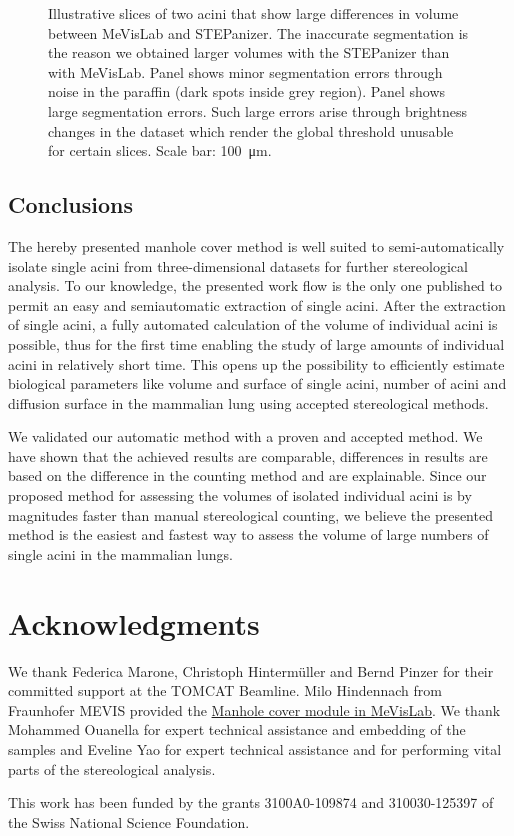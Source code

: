 \documentclass[twoside,paper=a4,abstract=true,english,DIV=calc]{scrartcl}
\begin{document}
\begin{figure}
{		\label{subfig:60e_acinus38}%
	}%
	\hfill%
	\caption{Illustrative slices of two acini that show large differences in volume between MeVisLab and STEPanizer. The inaccurate segmentation is the reason we obtained larger volumes with the STEPanizer than with MeVisLab. Panel \protect{} shows minor segmentation errors through noise in the paraffin (dark spots inside grey region). Panel \protect{} shows large segmentation errors. Such large errors arise through brightness changes in the dataset which render the global threshold unusable for certain slices. Scale bar: \SI{100}{\micro\meter}.}
	\label{fig:MeVisSegmentation}
\end{figure}

\subsection{Conclusions}
The hereby presented manhole cover method is well suited to semi-automatically isolate single acini from three-dimensional datasets for further stereological analysis. To our knowledge, the presented work flow is the only one published to permit an easy and semiautomatic extraction of single acini. After the extraction of single acini, a fully automated calculation of the volume of individual acini is possible, thus for the first time enabling the study of large amounts of individual acini in relatively short time. This opens up the possibility to efficiently estimate biological parameters like volume and surface of single acini, number of acini and diffusion surface in the mammalian lung using accepted stereological methods.

We validated our automatic method with a proven and accepted method. We have shown that the achieved results are comparable, differences in results are based on the difference in the counting method and are explainable. Since our proposed method for assessing the volumes of isolated individual acini is by magnitudes faster than manual stereological counting, we believe the presented method is the easiest and fastest way to assess the volume of large numbers of single acini in the mammalian lungs.

\clearpage
\section{Acknowledgments}
We thank Federica Marone, Christoph Hintermüller and Bernd Pinzer for their committed support at the TOMCAT Beamline. Milo Hindennach from Fraunhofer MEVIS provided the \href{http://www.mevis-research.de/cgi-bin/discus/board-auth.cgi?lm=1282233250&file=/839/11760.html}{Manhole cover module in MeVisLab}. We thank Mohammed Ouanella for expert technical assistance and embedding of the samples and Eveline Yao for expert technical assistance and for performing vital parts of the stereological analysis.

This work has been funded by the grants 3100A0-109874 and 310030-125397 of the Swiss National Science Foundation.

\clearpage
\singlespacing


\end{document}
